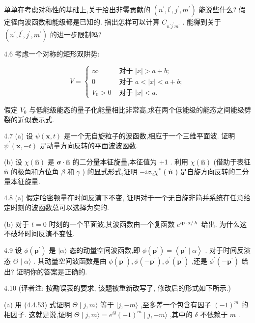 单单在考虑对称性的基础上,关于给出非零贡献的 $\left( {{n}^{\prime },{l}^{\prime },{j}^{\prime },{m}^{\prime }}\right)$ 能说些什么? 假定径向波函数和能级都是已知的. 指出怎样可以计算 ${C}_{{n}^{\prime }{j}^{\prime }{m}^{\prime }}$ . 能得到关于 $\left( {{n}^{\prime },{l}^{\prime },{j}^{\prime },{m}^{\prime }}\right)$ 的进一步限制吗?

4.6 考虑一个对称的矩形双阱势:

$$
V = \left\{ \begin{array}{ll} \infty & \text{ 对于 }\left| x\right| > a + b; \\ 0 & \text{ 对于 }a < \left| x\right| < a + b; \\ {V}_{0} > 0 & \text{ 对于 }\left| x\right| < a. \end{array}\right.
$$

假定 ${V}_{0}$ 与低能级能态的量子化能量相比非常高,求在两个低能级的能态之间能级劈裂的近似表示式.

4.7 (a) 设 $\psi \left( {\mathbf{x}, t}\right)$ 是一个无自旋粒子的波函数,相应于一个三维平面波. 证明 ${\psi }^{\prime }\left( {\mathbf{x}, - t}\right)$ 是动量方向反转的平面波波函数.

(b) 设 $\chi \left( \widehat{\mathbf{n}}\right)$ 是 $\mathbf{\sigma } \cdot \widehat{\mathbf{n}}$ 的二分量本征旋量,本征值为 +1 . 利用 $\chi \left( \widehat{\mathbf{n}}\right)$ (借助于表征 $\widehat{\mathbf{n}}$ 的极角和方位角 $\beta$ 和 $\gamma$ ) 的显式形式,证明 $- i{\sigma }_{2}{\chi }^{ * }$ ( $\widehat{\mathbf{n}}$ ) 是自旋方向反转的二分量本征旋量.

4.8 (a) 假定哈密顿量在时间反演下不变, 证明对于一个无自旋非简并系统在任意给定时刻的波函数总可以选择为实的.

(b) 对于 $t = 0$ 时刻的一个平面波,其波函数由一个复函数 ${e}^{i\mathbf{p} \cdot \mathbf{x}/\hslash }$ 给出. 为什么这不破坏时间反演不变性.

4.9 设 $\phi \left( {\mathbf{p}}^{\prime }\right)$ 是 $|\alpha \rangle$ 态的动量空间波函数,即 $\phi \left( {\mathbf{p}}^{\prime }\right) = \left\langle {{\mathbf{p}}^{\prime } \mid \alpha }\right\rangle$ . 对于时间反演态 $\Theta \mid \alpha \rangle$ . 其动量空间波函数是由 $\phi \left( {\mathbf{p}}^{\prime }\right) ,\phi \left( {-{\mathbf{p}}^{\prime }}\right) ,{\phi }^{\prime }\left( {\mathbf{p}}^{\prime }\right)$ ,还是 ${\phi }^{\prime }\left( {-{\mathbf{p}}^{\prime }}\right)$ 给出? 证明你的答案是正确的.

4.10 (译者注: 按勘误表的要求, 该题被重新改写了, 修改后的形式如下所示.)

(a) 用 (4.4.53) 式证明 $\Theta \mid j, m\rangle$ 等于 $|j, - m\rangle$ ,至多差一个包含有因子 ${\left( -1\right) }^{m}$ 的相因子. 这就是说,证明 $\Theta \mid j, m\rangle = {e}^{i\delta }{\left( -1\right) }^{m} \mid j, - m\rangle$ ,其中的 $\delta$ 不依赖于 $m$ .

